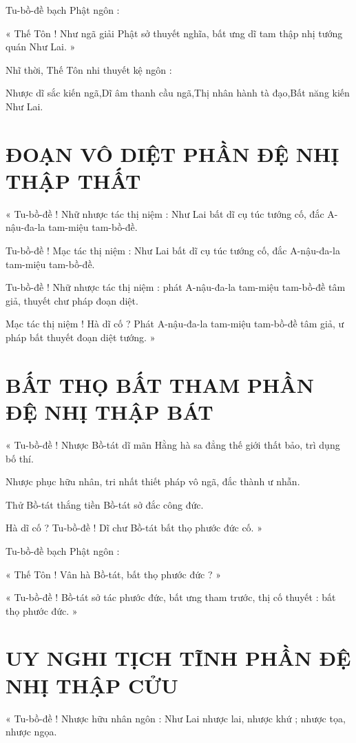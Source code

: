 	Tu-bồ-đề bạch Phật ngôn :
	
	« Thế Tôn ! Như ngã giải Phật sở thuyết nghĩa, bất ưng dĩ tam thập nhị tướng quán Như Lai. »
	
	Nhĩ thời, Thế Tôn nhi thuyết kệ ngôn :
	
	Nhược dĩ sắc kiến ngã,Dĩ âm thanh cầu ngã,Thị nhân hành tà đạo,Bất năng kiến Như Lai.
	
	\section*{ ĐOẠN VÔ DIỆT PHẦN ĐỆ NHỊ THẬP THẤT}
	
	« Tu-bồ-đề ! Nhữ nhược tác thị niệm : Như Lai bất dĩ cụ túc tướng cố, đắc A-nậu-đa-la tam-miệu tam-bồ-đề.
	
	Tu-bồ-đề ! Mạc tác thị niệm : Như Lai bất dĩ cụ túc tướng cố, đắc A-nậu-đa-la tam-miệu tam-bồ-đề. 
	
	Tu-bồ-đề ! Nhữ nhược tác thị niệm : phát A-nậu-đa-la tam-miệu tam-bồ-đề tâm giả, thuyết chư pháp đoạn diệt. 
	
	Mạc tác thị niệm ! Hà dĩ cố ? Phát A-nậu-đa-la tam-miệu tam-bồ-đề tâm giả, ư pháp bất thuyết đoạn diệt tướng. »
	
	\section*{BẤT THỌ BẤT THAM PHẦN ĐỆ NHỊ THẬP BÁT}
	
	« Tu-bồ-đề ! Nhược Bồ-tát dĩ mãn Hằng hà sa đẳng thế giới thất bảo, trì dụng bố thí.
	
	Nhược phục hữu nhân, tri nhất thiết pháp vô ngã, đắc thành ư nhẫn. 
	
	Thử Bồ-tát thắng tiền Bồ-tát sở đắc công đức. 
	
	Hà dĩ cố ? Tu-bồ-đề ! Dĩ chư Bồ-tát bất thọ phước đức cố. »
	
	Tu-bồ-đề bạch Phật ngôn :
	
	« Thế Tôn ! Vân hà Bồ-tát, bất thọ phước đức ? »
	
	« Tu-bồ-đề ! Bồ-tát sở tác phước đức, bất ưng tham trước, thị cố thuyết : bất thọ phước đức. »
	
	\section*{UY NGHI TỊCH TĨNH PHẦN ĐỆ NHỊ THẬP CỬU}
	
	« Tu-bồ-đề ! Nhược hữu nhân ngôn : Như Lai nhược lai, nhược khứ ; nhược tọa, nhược ngọa. 
	
